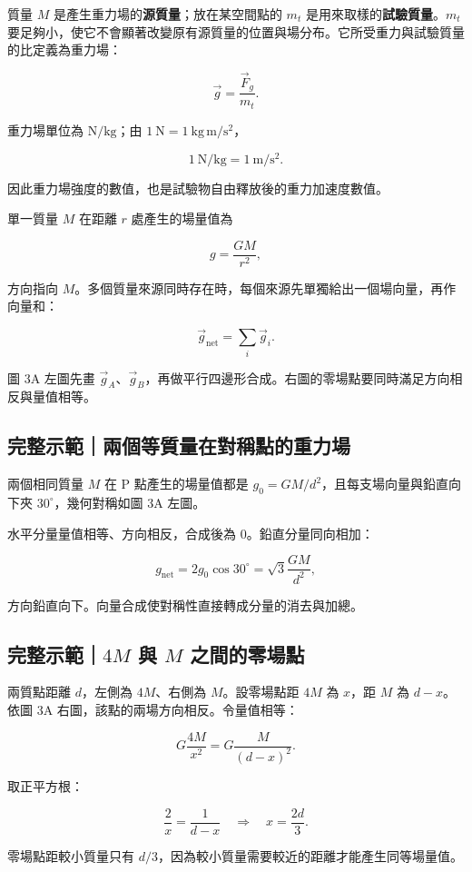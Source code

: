 \documentclass[11pt,a4paper]{article}
\begin{document}
質量 \(M\) 是產生重力場的\textbf{源質量}；放在某空間點的 \(m_t\) 是用來取樣的\textbf{試驗質量}。\(m_t\) 要足夠小，使它不會顯著改變原有源質量的位置與場分布。它所受重力與試驗質量的比定義為重力場：

\[
\boxed{\vec g=\frac{\vec F_g}{m_t}}.
\]

重力場單位為 \(\mathrm{N/kg}\)；由 \(1\ \mathrm N=1\ \mathrm{kg\,m/s^2}\)，

\[
1\ \mathrm{N/kg}=1\ \mathrm{m/s^2}.
\]

因此重力場強度的數值，也是試驗物自由釋放後的重力加速度數值。

單一質量 \(M\) 在距離 \(r\) 處產生的場量值為

\[
g=\frac{GM}{r^2},
\]

方向指向 \(M\)。多個質量來源同時存在時，每個來源先單獨給出一個場向量，再作向量和：

\[
\boxed{\vec g_{\mathrm{net}}=\sum_i\vec g_i}.
\]

圖 3A 左圖先畫 \(\vec g_A\)、\(\vec g_B\)，再做平行四邊形合成。右圖的零場點要同時滿足方向相反與量值相等。

\begin{HandoutWorkedExample}

\subsection{完整示範｜兩個等質量在對稱點的重力場}\label{ux5b8cux6574ux793aux7bc4ux5169ux500bux7b49ux8ceaux91cfux5728ux5c0dux7a31ux9edeux7684ux91cdux529bux5834}

兩個相同質量 \(M\) 在 P 點產生的場量值都是 \(g_0=GM/d^2\)，且每支場向量與鉛直向下夾 \(30^\circ\)，幾何對稱如圖 3A 左圖。

水平分量量值相等、方向相反，合成後為 0。鉛直分量同向相加：

\[
g_{\mathrm{net}}=2g_0\cos30^\circ
=\sqrt3\frac{GM}{d^2},
\]

方向鉛直向下。向量合成使對稱性直接轉成分量的消去與加總。

\end{HandoutWorkedExample}

\begin{HandoutWorkedExample}

\subsection{\texorpdfstring{完整示範｜\(4M\) 與 \(M\) 之間的零場點}{完整示範｜4M 與 M 之間的零場點}}\label{ux5b8cux6574ux793aux7bc44m-ux8207-m-ux4e4bux9593ux7684ux96f6ux5834ux9ede}

兩質點距離 \(d\)，左側為 \(4M\)、右側為 \(M\)。設零場點距 \(4M\) 為 \(x\)，距 \(M\) 為 \(d-x\)。依圖 3A 右圖，該點的兩場方向相反。令量值相等：

\[
G\frac{4M}{x^2}
=G\frac{M}{(d-x)^2}.
\]

取正平方根：

\[
\frac2x=\frac1{d-x}
\quad\Rightarrow\quad
x=\frac{2d}{3}.
\]

零場點距較小質量只有 \(d/3\)，因為較小質量需要較近的距離才能產生同等場量值。

\end{HandoutWorkedExample}
\end{document}
